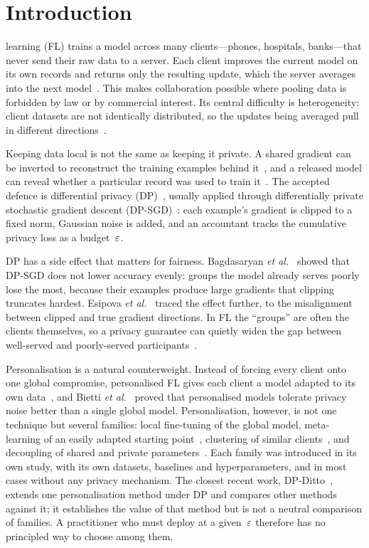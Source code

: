 \section{Introduction}
 learning (FL) trains a model across many clients---phones, hospitals, banks---that never
send their raw data to a server. Each client improves the current model on its own records and returns only the
resulting update, which the server averages into the next model~\cite{mcmahan2017communication,li2020federated}.
This makes collaboration possible where pooling data is forbidden by law or by commercial interest. Its central
difficulty is heterogeneity: client datasets are not identically distributed, so the updates being averaged pull
in different directions~\cite{kairouz2021advances}.

Keeping data local is not the same as keeping it private. A shared gradient can be inverted to reconstruct the
training examples behind it~\cite{zhu2019deep}, and a released model can reveal whether a particular record was
used to train it~\cite{shokri2017membership,nasr2019comprehensive}. The accepted defence is differential privacy
(DP)~\cite{dwork2006calibrating}, usually applied through differentially private stochastic gradient descent
(DP-SGD)~\cite{abadi2016deep}: each example's gradient is clipped to a fixed norm, Gaussian noise is added, and an
accountant tracks the cumulative privacy loss as a budget~$\varepsilon$.

DP has a side effect that matters for fairness. Bagdasaryan \emph{et al.}~\cite{bagdasaryan2019differential} showed
that DP-SGD does not lower accuracy evenly: groups the model already serves poorly lose the most, because their
examples produce large gradients that clipping truncates hardest. Esipova \emph{et al.}~\cite{esipova2023disparate}
traced the effect further, to the misalignment between clipped and true gradient directions. In FL the ``groups''
are often the clients themselves, so a privacy guarantee can quietly widen the gap between well-served and
poorly-served participants~\cite{chen2023privacy,rafi2024fairness}.

Personalisation is a natural counterweight. Instead of forcing every client onto one global compromise,
personalised FL gives each client a model adapted to its own data~\cite{tan2023towards}, and Bietti
\emph{et al.}~\cite{bietti2022personalization} proved that personalised models tolerate privacy noise better than a
single global model. Personalisation, however, is not one technique but several families: local fine-tuning of the
global model, meta-learning of an easily adapted starting point~\cite{fallah2020personalized}, clustering of
similar clients~\cite{ghosh2022efficient}, and decoupling of shared and private
parameters~\cite{arivazhagan2019federated,collins2021exploiting}. Each family was introduced in its own study, with
its own datasets, baselines and hyperparameters, and in most cases without any privacy mechanism. The closest recent
work, DP-Ditto~\cite{zhao2025convergence}, extends one personalisation method under DP and compares other methods
against it; it establishes the value of that method but is not a neutral comparison of families. A practitioner who
must deploy at a given~$\varepsilon$ therefore has no principled way to choose among them.

